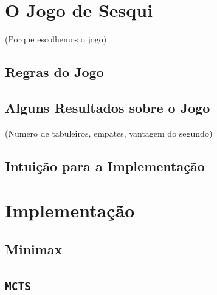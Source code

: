 \documentclass[12pt,a4paper,oneside]{article}
\begin{document}
\section{O Jogo de Sesqui}
\label{sec:sesqui}

(Porque escolhemos o jogo)

\lipsum[1]

\subsection{Regras do Jogo}

\lipsum[1]

\lipsum[2]

\lipsum[3]

\subsection{Alguns Resultados sobre o Jogo}

(Numero de tabuleiros, empates, vantagem do segundo)

\lipsum[1]

\lipsum[2]

\subsection{Intuição para a Implementação}

\lipsum[1]

\lipsum[2]


\section{Implementação}
\label{sec:imp}

\lipsum[1]

\subsection{Minimax}

\lipsum[1]

\lipsum[2]

\subsection{\texttt{MCTS}}
\end{document}
